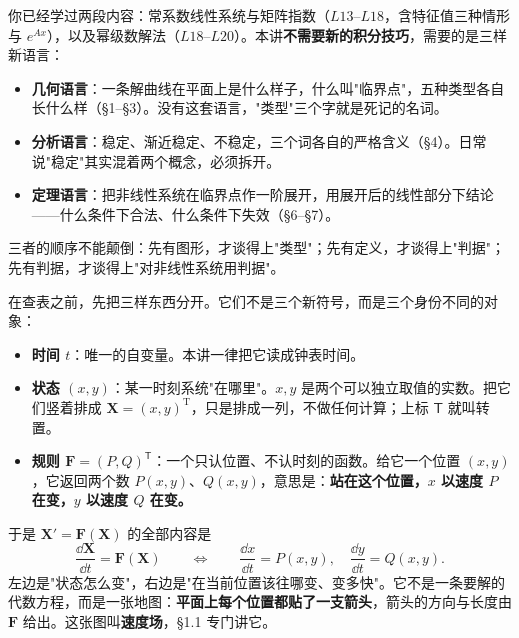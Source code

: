 \documentclass[11pt]{ctexart}
\newcommand{\X}{\mathbf{X}}\newcommand{\Y}{\mathbf{Y}}
\newcommand{\F}{\mathbf{F}}
\begin{document}

你已经学过两段内容：常系数线性系统与矩阵指数（$L13$--$L18$，含特征值三种情形与 $e^{Ax}$），以及幂级数解法（$L18$--$L20$）。本讲\textbf{不需要新的积分技巧}，需要的是三样新语言：

\begin{itemize}
\item \textbf{几何语言}：一条解曲线在平面上是什么样子，什么叫"临界点"，五种类型各自长什么样（§1--§3）。没有这套语言，"类型"三个字就是死记的名词。
\item \textbf{分析语言}：稳定、渐近稳定、不稳定，三个词各自的严格含义（§4）。日常说"稳定"其实混着两个概念，必须拆开。
\item \textbf{定理语言}：把非线性系统在临界点作一阶展开，用展开后的线性部分下结论——什么条件下合法、什么条件下失效（§6--§7）。
\end{itemize}

三者的顺序不能颠倒：先有图形，才谈得上"类型"；先有定义，才谈得上"判据"；先有判据，才谈得上"对非线性系统用判据"。


在查表之前，先把三样东西分开。它们不是三个新符号，而是三个身份不同的对象：

\begin{itemize}
\item \textbf{时间 $t$}：唯一的自变量。本讲一律把它读成钟表时间。
\item \textbf{状态 $(x,y)$}：某一时刻系统"在哪里"。$x,y$ 是两个可以独立取值的实数。把它们竖着排成 $\X=(x,y)^{\mathrm T}$，只是排成一列，不做任何计算；上标 $\mathsf T$ 就叫转置。
\item \textbf{规则 $\F=(P,Q)^{\mathsf T}$}：一个只认位置、不认时刻的函数。给它一个位置 $(x,y)$，它返回两个数 $P(x,y)$、$Q(x,y)$，意思是：\textbf{站在这个位置，$x$ 以速度 $P$ 在变，$y$ 以速度 $Q$ 在变。}
\end{itemize}

于是 $\X'=\F(\X)$ 的全部内容是
\[
\frac{\dd\X}{\dd t}=\F(\X)
\qquad\Longleftrightarrow\qquad
\frac{\dd x}{\dd t}=P(x,y),\quad
\frac{\dd y}{\dd t}=Q(x,y).
\]
左边是"状态怎么变"，右边是"在当前位置该往哪变、变多快"。它不是一条要解的代数方程，而是一张地图：\textbf{平面上每个位置都贴了一支箭头}，箭头的方向与长度由 $\F$ 给出。这张图叫\textbf{速度场}，§1.1 专门讲它。

\end{document}

